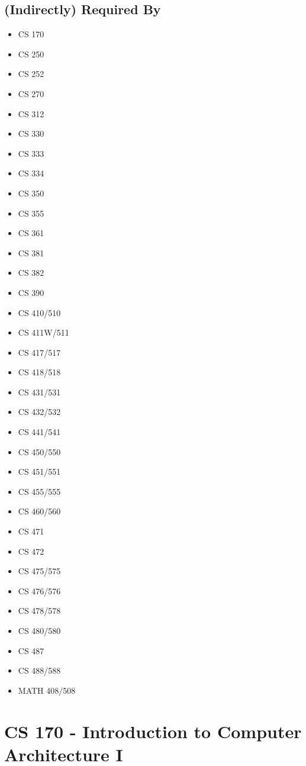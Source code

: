 \documentclass[]{article}
\providecommand{\tightlist}{%
  \setlength{\itemsep}{0pt}\setlength{\parskip}{0pt}}
\begin{document}
\subsection{(Indirectly) Required By}\label{indirectly-required-by}

\begin{multicols}{2}
\begin{itemize}
\tightlist
\item
  CS 170
\item
  CS 250
\item
  CS 252
\item
  CS 270
\item
  CS 312
\item
  CS 330
\item
  CS 333
\item
  CS 334
\item
  CS 350
\item
  CS 355
\item
  CS 361
\item
  CS 381
\item
  CS 382
\item
  CS 390
\item
  CS 410/510
\item
  CS 411W/511
\item
  CS 417/517
\item
  CS 418/518
\item
  CS 431/531
\item
  CS 432/532
\item
  CS 441/541
\item
  CS 450/550
\item
  CS 451/551
\item
  CS 455/555
\item
  CS 460/560
\item
  CS 471
\item
  CS 472
\item
  CS 475/575
\item
  CS 476/576
\item
  CS 478/578
\item
  CS 480/580
\item
  CS 487
\item
  CS 488/588
\item
  MATH 408/508
\end{itemize}
\end{multicols}


\section{CS 170 - Introduction to Computer Architecture
I}\label{cs-170---introduction-to-computer-architecture-i}
\end{document}
